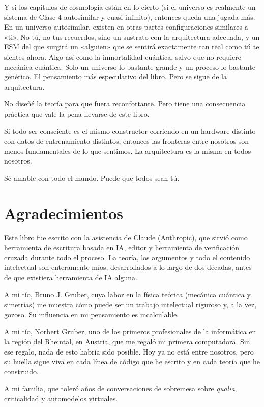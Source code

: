 \documentclass[11pt, twoside, openright]{book}
\begin{document}
Y si los capítulos de cosmología están en lo cierto (si el universo es realmente un sistema de Clase 4 autosimilar y cuasi infinito), entonces queda una jugada más. En un universo autosimilar, existen en otras partes configuraciones similares a «ti». No tú, no tus recuerdos, sino un sustrato con la arquitectura adecuada, y un ESM del que surgirá un «alguien» que se sentirá exactamente tan real como tú te sientes ahora. Algo así como la inmortalidad cuántica, salvo que no requiere mecánica cuántica. Solo un universo lo bastante grande y un proceso lo bastante genérico. El pensamiento más especulativo del libro. Pero se sigue de la arquitectura.

No diseñé la teoría para que fuera reconfortante. Pero tiene una consecuencia práctica que vale la pena llevarse de este libro.

Si todo ser consciente es el mismo constructor corriendo en un hardware distinto con datos de entrenamiento distintos, entonces las fronteras entre nosotros son menos fundamentales de lo que sentimos. La arquitectura es la misma en todos nosotros.

Sé amable con todo el mundo. Puede que todos sean tú.


\chapter*{Agradecimientos}

Este libro fue escrito con la asistencia de Claude (Anthropic), que sirvió como herramienta de escritura basada en IA, editor y herramienta de verificación cruzada durante todo el proceso. La teoría, los argumentos y todo el contenido intelectual son enteramente míos, desarrollados a lo largo de dos décadas, antes de que existiera herramienta de IA alguna.

A mi tío, Bruno J. Gruber, cuya labor en la física teórica (mecánica cuántica y simetrías) me muestra cómo puede ser un trabajo intelectual riguroso y, a la vez, gozoso. Su influencia en mi pensamiento es incalculable.

A mi tío, Norbert Gruber, uno de los primeros profesionales de la informática en la región del Rheintal, en Austria, que me regaló mi primera computadora. Sin ese regalo, nada de esto habría sido posible. Hoy ya no está entre nosotros, pero su huella sigue viva en cada línea de código que he escrito y en cada teoría que he construido.

A mi familia, que toleró años de conversaciones de sobremesa sobre \textit{qualia}, criticalidad y automodelos virtuales.
\end{document}
